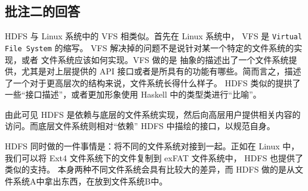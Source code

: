 
\subsection{批注二的回答}
\label{sec:fix:bl2}

HDFS 与 Linux 系统中的 VFS 相类似。首先在 Linux 系统中， VFS 是 \verb|Virtual File System| 的缩写。 VFS 解决掉的问题不是说针对某一个特定的文件系统的实现，或者
文件系统应该如何实现。VFS 做的是 抽象的描述出了一个文件系统提供，尤其是对上层提供的 API 接口或者是所具有的功能有哪些。简而言之，描述了一个对于更高层次的结构来说，文件系统长得什么样子。
HDFS 类似的提拱了一些“接口描述”，或者更加形象使用 Haskell 中的类型类进行“比喻”。

由此可见 HDFS 是依赖与底层的文件系统实现，然后向高层用户提供相关内容的访问。而底层文件系统则相对“依赖” HDFS 中描绘的接口，以规范自身。

HDFS 同时做的一件事情是：将不同的文件系统对接到一起。正如在 Linux 中，我们可以将 Ext4 文件系统下的文件复制到 exFAT 文件系统中， HDFS 也提供了类似的支持。
本身两种不同文件系统会具有比较大的差异，而 HDFS 做的是从文件系统A中拿出东西，在放到文件系统B中。